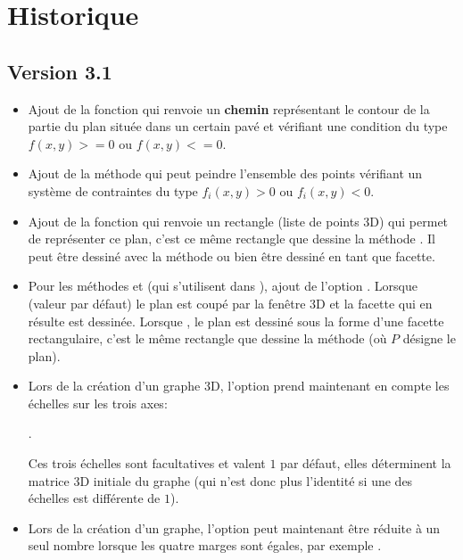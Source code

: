 \section{Historique}
\subsection{Version 3.1}

\begin{itemize}
    \item Ajout de la fonction  qui renvoie un \textbf{chemin} représentant le contour de la partie du plan située dans un certain pavé et vérifiant une condition du type $f(x,y)>=0$ ou $f(x,y)<=0$.
    
    \item Ajout de la méthode  qui peut peindre l'ensemble des points vérifiant un système de contraintes du type $f_i(x,y)>0$ ou $f_i(x,y)<0$.
    
    \item Ajout de la fonction  qui renvoie un rectangle (liste de points 3D) qui permet de représenter ce plan, c'est ce même rectangle que dessine la méthode . Il peut être dessiné avec la méthode  ou bien être dessiné en tant que facette.
    
    \item Pour les méthodes  et  (qui s'utilisent dans ), ajout de l'option . Lorsque  (valeur par défaut) le plan est coupé par la fenêtre 3D et la facette qui en résulte est dessinée. Lorsque , le plan est dessiné sous la forme d'une facette rectangulaire, c'est le même rectangle que dessine la méthode  (où $P$ désigne le plan).
    
    \item Lors de la création d'un graphe 3D, l'option  prend maintenant en compte les échelles sur les trois axes: \par
    \hfil{}.\hfil\par
    Ces trois échelles sont facultatives et valent $1$ par défaut, elles déterminent la matrice 3D initiale du graphe (qui n'est donc plus l'identité si une des échelles est différente de $1$).
    
    \item Lors de la création d'un graphe, l'option  peut maintenant être réduite à un seul nombre lorsque les quatre marges sont égales, par exemple .
    

\end{itemize}

